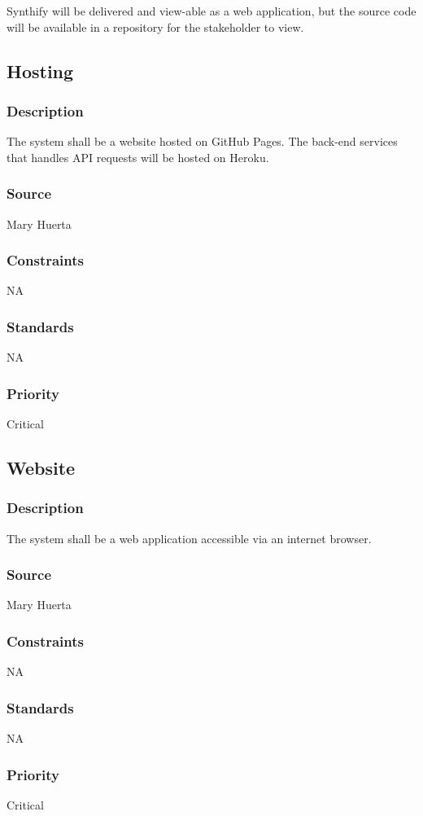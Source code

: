 Synthify will be delivered and view-able as a web application, but the source code will be available in a repository for the stakeholder to view. 

\subsection{Hosting}
\subsubsection{Description}
The system shall be a website hosted on GitHub Pages.
The back-end services that handles API requests will be hosted on Heroku.
\subsubsection{Source}
Mary Huerta
\subsubsection{Constraints}
NA
\subsubsection{Standards}
NA
\subsubsection{Priority}
Critical

\subsection{Website}
\subsubsection{Description}
The system shall be a web application accessible via an internet browser.
\subsubsection{Source}
Mary Huerta
\subsubsection{Constraints}
NA
\subsubsection{Standards}
NA
\subsubsection{Priority}
Critical